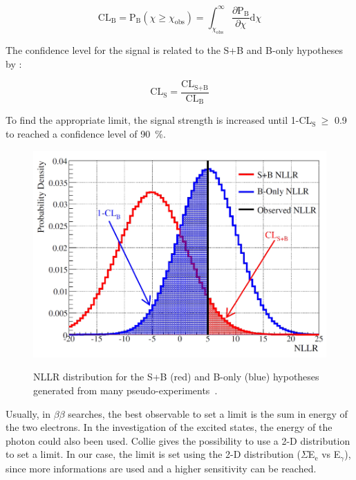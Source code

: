 \documentclass[main.tex]{subfiles}
\begin{document}
\begin{equation}
\text{CL}_{\text{B}} = \text{P}_{\text{B}} (\chi \geq \chi_{\text{obs}} ) = \int_{\chi_{\text{obs}}}^{\infty} \frac{\partial \text{P}_{\text{B}} }{\partial \chi} \text{d}\chi 
\end{equation}


\bigskip


\NI The confidence level for the signal is related to the S+B and B-only hypotheses by : 


\begin{equation}
\text{CL}_{\text{S}} = \frac{\text{CL}_{\text{S+B}} }{\text{CL}_{\text{B}} } 
\end{equation}


\bigskip


\NI To find the appropriate limit, the signal strength is increased until 1-CL$_\text{S}~\geq$ 0.9 to reached a confidence level of 90~\%. 


\begin{figure}[h!]
\centering
\includegraphics[scale=0.35]{pictures/Chap6/NLLR.png}
\label{NLLR}
\caption{NLLR distribution for the S+B (red) and B-only (blue) hypotheses generated from many pseudo-experiments~\cite{NLLR}.}
\end{figure}


\bigskip


\NI Usually, in $\beta\beta$ searches, the best observable to set a limit is the sum in energy of the two electrons. In the investigation of the excited states, the energy of the photon could also been used. Collie gives the possibility to use a 2-D distribution to set a limit. In our case, the limit is set using the 2-D distribution ($\Sigma$E$_\text{e}$ vs E$_{\gamma}$), since more informations are used and a higher sensitivity can be reached.   
\end{document}
